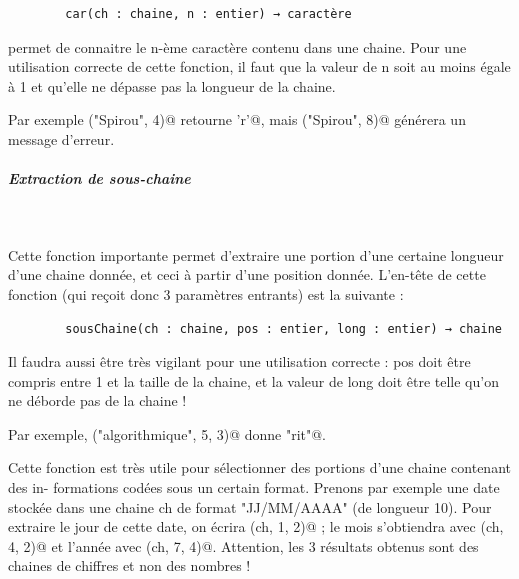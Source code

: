 \documentclass[11pt,a4paper]{article}
\begin{document}
            \par
        \begin{verbatim}
        car(ch : chaine, n : entier) → caractère
      \end{verbatim}
        permet de connaitre le n-\`eme caract\`ere contenu dans une chaine. Pour une utilisation correcte
        de cette fonction, il faut que la valeur de n soit au moins \'egale \`a 1 et qu'elle ne d\'epasse
        pas la longueur de la chaine. 
      
            \par
        
        Par exemple \verb@car("Spirou", 4)@ retourne \verb@’r’@, 
        mais \verb@car("Spirou", 8)@
        g\'en\'erera un message d'erreur.
      
            \par
        
			
		\subparagraph{Extraction de sous-chaine} 
		
					\textcolor{white}{.} \par
				
        Cette fonction importante permet d'extraire une portion d'une certaine longueur d'une
        chaine donn\'ee, et ceci \`a partir d'une position donn\'ee. L'en-t\^ete de cette fonction (qui re\c coit
        donc 3 param\`etres entrants) est la suivante :
       
            \par
        \begin{verbatim}
        sousChaine(ch : chaine, pos : entier, long : entier) → chaine
      \end{verbatim}
        Il faudra aussi \^etre tr\`es vigilant pour une utilisation correcte : pos doit \^etre compris entre 1
        et la taille de la chaine, et la valeur de long doit \^etre telle qu'on ne d\'eborde pas de la chaine !
      
            \par
        
        Par exemple, \verb@sousChaine("algorithmique", 5, 3)@ donne \verb@"rit"@.
      
            \par
        
        Cette fonction est tr\`es utile pour s\'electionner des portions d'une chaine contenant des in-
        formations cod\'ees sous un certain format. Prenons par exemple une date stock\'ee dans une
        chaine ch de format "JJ/MM/AAAA" (de longueur 10). Pour extraire le jour de cette date,
        on \'ecrira \verb@sousChaine(ch, 1, 2)@ ; 
        le mois s'obtiendra avec \verb@sousChaine(ch, 4, 2)@ et l'ann\'ee avec
        \verb@sousChaine(ch, 7, 4)@. 
        Attention, les 3 r\'esultats obtenus sont des chaines de chiffres et non
        des nombres !
      
\end{document}
